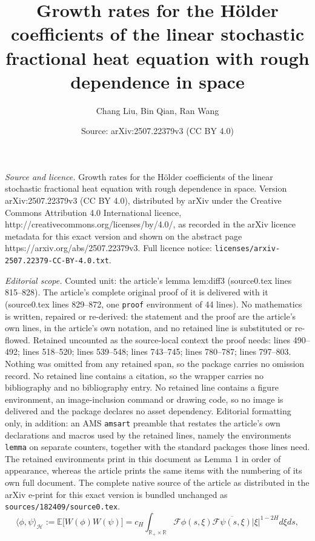 \documentclass[10pt,a4paper]{amsart}
\title{Growth rates for the H\"older coefficients of the linear stochastic fractional heat equation with rough dependence in space}
\author{Chang Liu, Bin Qian, Ran Wang}
\date{Source: arXiv:2507.22379v3 (CC BY 4.0)}
\def\EE{\mathbb{E}}
\def\RR{\mathbb{R}}
\def\cF{\mathcal{F}}
\begin{document}
\maketitle

\noindent\emph{Source and licence.} Growth rates for the H\"older coefficients of the linear stochastic fractional heat equation with rough dependence in space. Version arXiv:2507.22379v3 (CC BY 4.0), distributed by arXiv under the Creative Commons Attribution 4.0 International licence, http://creativecommons.org/licenses/by/4.0/, as recorded in the arXiv licence metadata for this exact version and shown on the abstract page https://arxiv.org/abs/2507.22379v3. Full licence notice: \texttt{licenses/arxiv-2507.22379-CC-BY-4.0.txt}.\par\smallskip

\noindent\textit{Editorial scope.} Counted unit: the article's lemma lem:diff3 (source0.tex lines 815--828). The article's complete original proof of it is delivered with it (source0.tex lines 829--872, one \texttt{proof} environment of 44 lines). No mathematics is written, repaired or re-derived: the statement and the proof are the article's own lines, in the article's own notation, and no retained line is substituted or re-flowed.  Retained uncounted as the source-local context the proof needs: lines 490--492; lines 518--520; lines 539--548; lines 743--745; lines 780--787; lines 797--803.  Nothing was omitted from any retained span, so the package carries no omission record.  No retained line contains a citation, so the wrapper carries no bibliography and no bibliography entry.  No retained line contains a figure environment, an image-inclusion command or drawing code, so no image is delivered and the package declares no asset dependency.  Editorial formatting only, in addition: an AMS \texttt{amsart} preamble that restates the article's own declarations and macros used by the retained lines, namely the environments \texttt{lemma} on separate counters, together with the standard packages those lines need.  The retained environments print in this document as Lemma 1 in order of appearance, whereas the article prints the same items with the numbering of its own full document.  The complete native source of the article as distributed in the arXiv e-print for this exact version is bundled unchanged as \texttt{sources/182409/source0.tex}.
     \begin{equation}\label{eq H product}
    \langle\phi,\psi\rangle_{\mathcal H}:= \EE\big[ W(\phi)W(\psi)\big]=c_{H}\int_{\RR_{+}\times \RR} \cF \phi(s,\xi) \overline{\cF \psi(s,\xi)}  |\xi|^{1-2H}d\xi ds,
     \end{equation}
\end{document}
